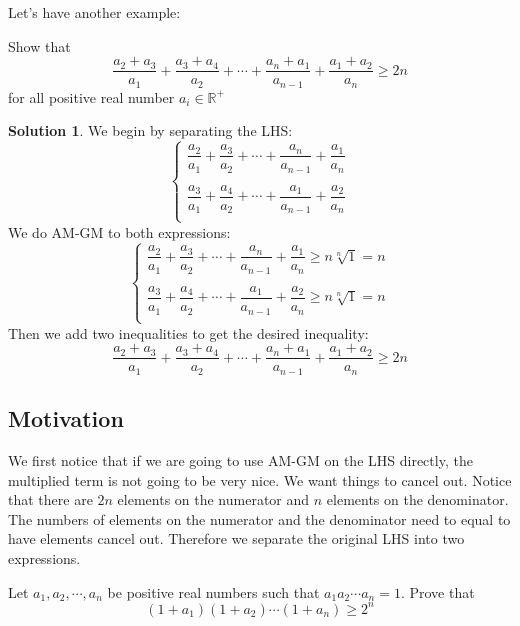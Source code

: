 \documentclass{article}
\theoremstyle{definition}
\newtheorem*{solution}{\color{blue}Solution}
\begin{document}
Let's have another example:
\begin{tcolorbox}
    Show that 
    $$\frac{a_2+a_3}{a_1}+\frac{a_3+a_4}{a_2}+\cdots+\frac{a_n+a_1}{a_{n-1}}+\frac{a_1+a_2}{a_n}\ge 2n$$
    for all positive real number $a_i\in\mathbb R^+$
\end{tcolorbox}

\begin{solution}
    We begin by separating the LHS: \\
    \[
    \begin{cases}
    \dfrac{a_2}{a_1}+\dfrac{a_3}{a_2}+\cdots+\dfrac{a_n}{a_{n-1}}+\dfrac{a_1}{a_n}\\\\
    \dfrac{a_3}{a_1}+\dfrac{a_4}{a_2}+\cdots+\dfrac{a_1}{a_{n-1}}+\dfrac{a_2}{a_n}\\
    \end{cases}
    \]
    We do AM-GM to both expressions:\\
    \[
    \begin{cases}
    \dfrac{a_2}{a_1}+\dfrac{a_3}{a_2}+\cdots+\dfrac{a_n}{a_{n-1}}+\dfrac{a_1}{a_n}\ge n\sqrt[n]{1}=n\\\\
    \dfrac{a_3}{a_1}+\dfrac{a_4}{a_2}+\cdots+\dfrac{a_1}{a_{n-1}}+\dfrac{a_2}{a_n}\ge n\sqrt[n]{1}=n\\
    \end{cases}
    \]
    Then we add two inequalities to get the desired inequality:
    $$\frac{a_2+a_3}{a_1}+\frac{a_3+a_4}{a_2}+\cdots+\frac{a_n+a_1}{a_{n-1}}+\frac{a_1+a_2}{a_n}\ge 2n$$
\end{solution}
\subsection*{Motivation}
We first notice that if we are going to use AM-GM on the LHS directly, the multiplied term is not going to be very nice. We want things to cancel out. Notice that there are $2n$ elements on the numerator and $n$ elements on the denominator. The numbers of elements on the numerator and the denominator need to equal to have elements cancel out. Therefore we separate the original LHS into two expressions. 
\pagebreak


\begin{tcolorbox}
    Let $a_1,a_2,\cdots ,a_n$ be positive real numbers such that $a_1a_2\cdots a_n=1$. Prove that 
    $$\left(1+a_1\right)\left(1+a_2\right)\cdots \left(1+a_n\right)\ge 2^n$$
\end{tcolorbox}
\end{document}
